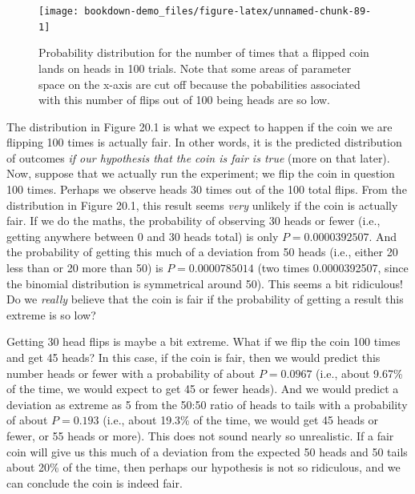 \documentclass[
]{scrbook}
\begin{document}
\begin{figure}
\texttt{[image: bookdown-demo\_files/figure-latex/unnamed-chunk-89-1]} \caption{Probability distribution for the number of times that a flipped coin lands on heads in 100 trials. Note that some areas of parameter space on the x-axis are cut off because the pobabilities associated with this number of flips out of 100 being heads are so low.}\label{fig:unnamed-chunk-89}
\end{figure}

The distribution in Figure 20.1 is what we expect to happen if the coin we are flipping 100 times is actually fair.
In other words, it is the predicted distribution of outcomes \emph{if our hypothesis that the coin is fair is true} (more on that later).
Now, suppose that we actually run the experiment; we flip the coin in question 100 times.
Perhaps we observe heads 30 times out of the 100 total flips.
From the distribution in Figure 20.1, this result seems \emph{very} unlikely if the coin is actually fair.
If we do the maths, the probability of observing 30 heads or fewer (i.e., getting anywhere between 0 and 30 heads total) is only \(P = 0.0000392507\).
And the probability of getting this much of a deviation from 50 heads (i.e., either 20 less than or 20 more than 50) is \(P = 0.0000785014\) (two times 0.0000392507, since the binomial distribution is symmetrical around 50).
This seems a bit ridiculous!
Do we \emph{really} believe that the coin is fair if the probability of getting a result this extreme is so low?

Getting 30 head flips is maybe a bit extreme.
What if we flip the coin 100 times and get 45 heads?
In this case, if the coin is fair, then we would predict this number heads or fewer with a probability of about \(P = 0.0967\) (i.e., about 9.67\% of the time, we would expect to get 45 or fewer heads).
And we would predict a deviation as extreme as 5 from the 50:50 ratio of heads to tails with a probability of about \(P = 0.193\) (i.e., about 19.3\% of the time, we would get 45 heads or fewer, or 55 heads or more).
This does not sound nearly so unrealistic.
If a fair coin will give us this much of a deviation from the expected 50 heads and 50 tails about 20\% of the time, then perhaps our hypothesis is not so ridiculous, and we can conclude the coin is indeed fair.
\end{document}
